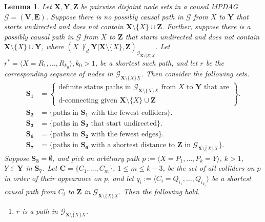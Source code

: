 \documentclass[11pt]{article}
\newtheorem{lemma}[theorem]{Lemma}
\newcommand{\mb}[1]{\mathbf{#1}}
\newcommand{\dsepp}{\perp_{d}}
\newcommand{\g}[1][G]{\mathcal{#1}}
\begin{document}
\begin{lemma}
\label{lem:collider-paths2}
    Let $\mb{X,Y,Z}$ be pairwise disjoint node sets in a causal MPDAG $\g = (\mb{V,E})$. Suppose there is no possibly causal path in $\g$ from $X$ to $\mb{Y}$ that starts undirected and does not contain $\mb{X} \setminus \{X\} \cup \mb{Z}$. Further, suppose there is a possibly causal path in $\g$ from $X$ to $\mb{Z}$ that starts undirected and does not contain $\mb{X} \setminus \{X\} \cup \mb{Y}$, where $(X \not \dsepp \mb{Y} | \mb{X} \setminus \{X\}, \mb{Z})_{\g_{\overline{\mb{X} \setminus \{X\}} \underline{X}}}$. Let $r^* = \langle X = R_1, \dots, R_{k_0}\rangle, k_0 >1$, be a shortest such path, and let $r$ be the corresponding sequence of nodes in $\g_{\overline{\mb{X} \setminus \{X\}} \underline{X}}$. Then consider the following sets.
    \begin{align*}
        \mb{S_1} &= \left\{\begin{array}{ll}
                                \text{definite status paths in $\g_{\overline{\mb{X} \setminus \{X\}} \underline{X}}$ from $X$ to $\mb{Y}$ that are} \\
                                \text{d-connecting given $\mb{X} \setminus \{X\} \cup \mb{Z}$}
                           \end{array}\right\}.\\
        \mb{S_2} &= \{ \text{paths in $\mb{S_1}$ with the fewest colliders} \}.\\
        \mb{S_3} &= \{ \text{paths in } \mb{S_2} \text{ that start undirected}\}.\\[.4cm]
        \mb{S_6} &= \{ \text{paths in $\mb{S_2}$ with the fewest edges} \}.\\
        \mb{S_7} &= \{ \text{paths in $\mb{S_6}$ with a shortest distance to $\mb{Z}$ in $\g_{\overline{\mb{X} \setminus \{X\}} \underline{X}}$} \}.
    \end{align*}
    Suppose  $\mb{S_3} = \emptyset$, and pick an arbitrary path $p := \langle X = P_1, \dots, P_k = Y \rangle$, $k > 1$, $Y \in \mb{Y}$ in $\mb{S_7}$. Let $\mb{C} = \{C_1, \dots, C_m \}$, $1 \le m \le k-3$, be the set of all colliders on $p$ in order of their appearance on $p$, and let $q_i := \langle C_i = Q_{i_1}, \dots, Q_{i_{k_i}} \rangle$ be a shortest causal path from $C_i$ to $\mb{Z}$ in $\g_{\overline{\mb{X} \setminus \{X\}} \underline{X}}$. Then the following hold.
    \begin{enumerate}[label = (\roman*)]
        \item\label{rprop0} $r$ is a path in $\g_{\overline{\mb{X} \setminus \{X\}} \underline{X}}$.
        

\end{enumerate}
\end{lemma}
\end{document}
